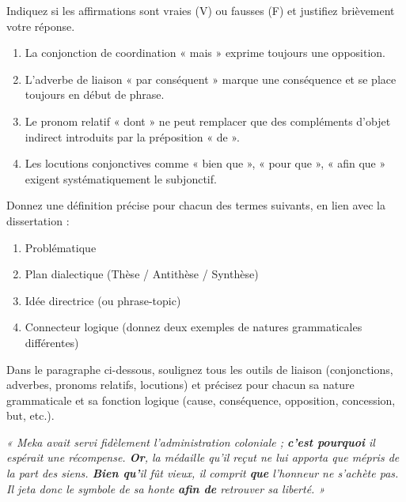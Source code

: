 \documentclass[11pt]{article}
\newcommand{\cle}[1]{{\popxbold\color{popdark}#1}}
\begin{document}
\begin{exercice}
Indiquez si les affirmations sont vraies (V) ou fausses (F) et justifiez brièvement votre réponse.
\begin{enumerate}
\item La conjonction de coordination « mais » exprime toujours une opposition.
\item L'adverbe de liaison « par conséquent » marque une conséquence et se place toujours en début de phrase.
\item Le pronom relatif « dont » ne peut remplacer que des compléments d'objet indirect introduits par la préposition « de ».
\item Les locutions conjonctives comme « bien que », « pour que », « afin que » exigent systématiquement le subjonctif.
\end{enumerate}
\end{exercice}

\begin{exercice}
Donnez une définition précise pour chacun des termes suivants, en lien avec la dissertation :
\begin{enumerate}
\item \cle{Problématique}
\item \cle{Plan dialectique} (Thèse / Antithèse / Synthèse)
\item \cle{Idée directrice} (ou phrase-topic)
\item \cle{Connecteur logique} (donnez deux exemples de natures grammaticales différentes)
\end{enumerate}
\end{exercice}

\begin{exercice}
Dans le paragraphe ci-dessous, soulignez tous les outils de liaison (conjonctions, adverbes, pronoms relatifs, locutions) et précisez pour chacun sa nature grammaticale et sa fonction logique (cause, conséquence, opposition, concession, but, etc.).

\textit{« Meka avait servi fidèlement l'administration coloniale ; \textbf{c'est pourquoi} il espérait une récompense. \textbf{Or}, la médaille qu'il reçut ne lui apporta que mépris de la part des siens. \textbf{Bien qu'}il fût vieux, il comprit \textbf{que} l'honneur ne s'achète pas. Il jeta donc le symbole de sa honte \textbf{afin de} retrouver sa liberté. »}
\end{exercice}
\end{document}

